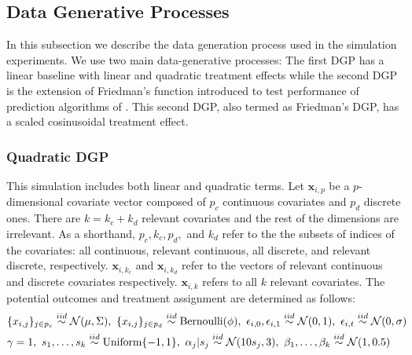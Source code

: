 \subsection{Data Generative Processes}
In this subsection we describe the data generation process used in the simulation experiments. We use two main data-generative processes: The first DGP has a linear baseline with linear and quadratic treatment effects while the second DGP is the extension of Friedman's function introduced to test performance of prediction algorithms of \cite{friedman1991multivariate}. This second DGP, also termed as Friedman's DGP, has a scaled cosinusoidal treatment effect.
\subsubsection{Quadratic DGP} \label{dgp1}
This simulation includes both linear and quadratic terms.
Let $\mathbf{x}_{i,p}$ be a $p$-dimensional covariate vector composed of $p_c$ continuous covariates and $p_d$ discrete ones.
There are $k = k_{c} + k_{d}$  relevant covariates and the rest of the dimensions are irrelevant. As a shorthand, $p_c,k_c,p_d,$ and $k_d$ refer to the the subsets of indices of the covariates: all continuous, relevant continuous, all discrete, and relevant discrete, respectively.
$\mathbf{x}_{i,k_c}$ and $\mathbf{x}_{i,k_d}$ refer to the vectors of relevant continuous and discrete covariates respectively.  $\mathbf{x}_{i,k}$ refers to all $k$ relevant covariates.
The potential outcomes and treatment assignment are determined as follows:
\begin{eqnarray*}
   \lefteqn{
    \{x_{i,j}\}_{j\in p_c} \overset{iid}{\sim} \mathcal{N}(\mu,\Sigma), \
    \{x_{i,j}\}_{j\in p_d} \overset{iid}{\sim} \text{Bernoulli}(\phi), \
    \epsilon_{i,0},\epsilon_{i,1} \overset{iid}{\sim} \mathcal{N}(0,1), \ 
    \epsilon_{i,t}\overset{iid}{\sim} \mathcal{N}(0,\sigma)}\\
    & \gamma = 1, \ s_1,\dots,s_k \overset{iid}{\sim} \text{Uniform}\{-1,1\}, \ \alpha_j|s_j \overset{iid}{\sim} \mathcal{N}(10s_j,3), \ \beta_1,\dots,\beta_k \overset{iid}{\sim} \mathcal{N}(1,0.5)
\end{eqnarray*}
